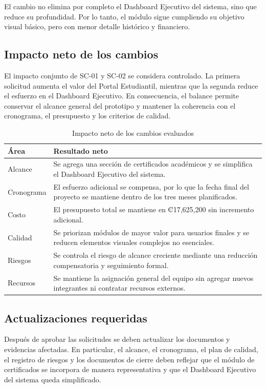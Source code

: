 \documentclass[11pt,spanish]{article}
\begin{document}
El cambio no elimina por completo el Dashboard Ejecutivo del sistema, sino que reduce su profundidad. Por lo tanto, el módulo sigue cumpliendo su objetivo visual básico, pero con menor detalle histórico y financiero.

\subsection{Impacto neto de los cambios}

El impacto conjunto de SC-01 y SC-02 se considera controlado. La primera solicitud aumenta el valor del Portal Estudiantil, mientras que la segunda reduce el esfuerzo en el Dashboard Ejecutivo. En consecuencia, el balance permite conservar el alcance general del prototipo y mantener la coherencia con el cronograma, el presupuesto y los criterios de calidad.

\begin{table}[H]
\centering
\caption{Impacto neto de los cambios evaluados}
\label{tab:impacto-neto}
{\small
\begin{tabularx}{\textwidth}{p{3.5cm} Y}
\toprule
\textbf{Área} & \textbf{Resultado neto} \\
\midrule
Alcance & Se agrega una sección de certificados académicos y se simplifica el Dashboard Ejecutivo del sistema. \\
Cronograma & El esfuerzo adicional se compensa, por lo que la fecha final del proyecto se mantiene dentro de los tres meses planificados. \\
Costo & El presupuesto total se mantiene en ₡17,625,200 sin incremento adicional. \\
Calidad & Se priorizan módulos de mayor valor para usuarios finales y se reducen elementos visuales complejos no esenciales. \\
Riesgos & Se controla el riesgo de alcance creciente mediante una reducción compensatoria y seguimiento formal. \\
Recursos & Se mantiene la asignación general del equipo sin agregar nuevos integrantes ni contratar recursos externos. \\
\bottomrule
\end{tabularx}
}
\end{table}

\subsection{Actualizaciones requeridas}

Después de aprobar las solicitudes se deben actualizar los documentos y evidencias afectadas. En particular, el alcance, el cronograma, el plan de calidad, el registro de riesgos y los documentos de cierre deben reflejar que el módulo de certificados se incorpora de manera representativa y que el Dashboard Ejecutivo del sistema queda simplificado.
\end{document}
